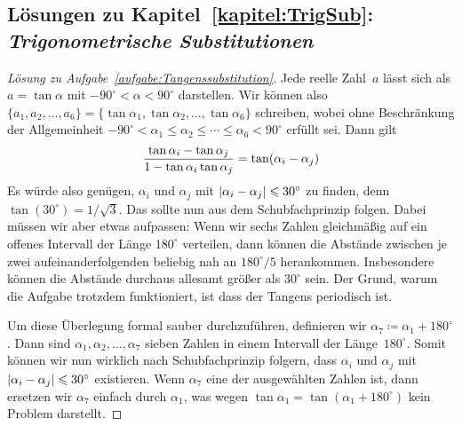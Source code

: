 \subsection*{Lösungen zu Kapitel~\ref{kapitel:TrigSub}: \emph{Trigonometrische Substitutionen}}

\begin{proof}[Lösung zu Aufgabe~\ref{aufgabe:Tangenssubstitution}]
	Jede reelle Zahl~$a$ lässt sich als $a=\tan\alpha$ mit $-90^\circ<\alpha<90^\circ$ darstellen. Wir können also $\{a_1,a_2,\dotsc,a_6\}=\{\tan\alpha_1,\tan\alpha_2,\dotsc,\tan\alpha_6\}$ schreiben, wobei ohne Beschränkung der Allgemeinheit $-90^\circ<\alpha_1\leqslant\alpha_2\leqslant\dotsb\leqslant\alpha_6<90^\circ$ erfüllt sei. Dann gilt
	\begin{equation*}
		\frac{\tan\alpha_i-\tan\alpha_j}{1-\tan\alpha_i\tan\alpha_j}=\tan\parens*{\alpha_i-\alpha_j}
	\end{equation*}
	Es würde also genügen, $\alpha_i$ und $\alpha_j$ mit $\lvert\alpha_i-\alpha_j\rvert\leqslant 30^\circ$ zu finden, denn $\tan(30^\circ)={1}/{\sqrt{3}}$. Das sollte nun aus dem Schubfachprinzip folgen. Dabei müssen wir aber etwas aufpassen: Wenn wir sechs Zahlen gleichmäßig auf ein offenes Intervall der Länge $180^\circ$ verteilen, dann können die Abstände zwischen je zwei aufeinanderfolgenden beliebig nah an $180^\circ/5$ herankommen. Insbesondere können die Abstände durchaus allesamt größer als $30^\circ$ sein. Der Grund, warum die Aufgabe trotzdem funktioniert, ist dass der Tangens periodisch ist.%
	
	Um diese Überlegung formal sauber durchzuführen, definieren wir $\alpha_7\coloneqq \alpha_1+180^\circ$. Dann sind $\alpha_1,\alpha_2,\dotsc,\alpha_7$ sieben Zahlen in einem Intervall der Länge~$180^\circ$. Somit können wir nun wirklich nach Schubfachprinzip folgern, dass $\alpha_i$ und $\alpha_j$ mit $\lvert\alpha_i-\alpha_j\rvert\leqslant 30^\circ$ existieren. Wenn $\alpha_7$ eine der ausgewählten Zahlen ist, dann ersetzen wir $\alpha_7$ einfach durch $\alpha_1$, was wegen $\tan\alpha_1=\tan(\alpha_1+180^\circ)$ kein Problem darstellt.
\end{proof}

